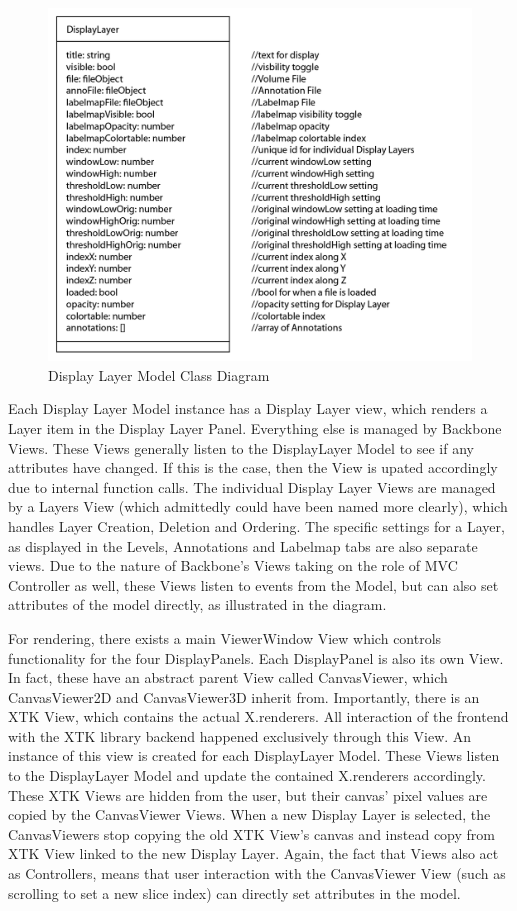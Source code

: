 \documentclass[a4paper,11pt,twoside]{article}
\begin{document}
\begin{figure}[ht!]
\centering
\includegraphics[width=140mm]{graphics/displayLayerUML_01.png}
\caption{Display Layer Model Class Diagram}
\label{fig:layerUML}
\end{figure}

Each Display Layer Model instance has a Display Layer view, which renders a Layer item in the Display Layer Panel. Everything else is managed by Backbone Views. These Views generally listen to the DisplayLayer Model to see if any attributes have changed. If this is the case, then the View is upated accordingly due to internal function calls. The individual Display Layer Views are managed by a Layers View (which admittedly could have been named more clearly), which handles Layer Creation, Deletion and Ordering. The specific settings for a Layer, as displayed in the Levels, Annotations and Labelmap tabs are also separate views. Due to the nature of Backbone's Views taking on the role of MVC Controller as well, these Views listen to events from the Model, but can also set attributes of the model directly, as illustrated in the diagram.

For rendering, there exists a main ViewerWindow View which controls functionality for the four DisplayPanels. Each DisplayPanel is also its own View. In fact, these have an abstract parent View called CanvasViewer, which CanvasViewer2D and CanvasViewer3D inherit from. Importantly, there is an XTK View, which contains the actual X.renderers. All interaction of the frontend with the XTK library backend happened exclusively through this View. An instance of this view is created for each DisplayLayer Model. These Views listen to the DisplayLayer Model and update the contained X.renderers accordingly. These XTK Views are hidden from the user, but their canvas' pixel values are copied by the CanvasViewer Views. When a new Display Layer is selected, the CanvasViewers stop copying the old XTK View's canvas and instead copy from XTK View linked to the new Display Layer. Again, the fact that Views also act as Controllers, means that user interaction with the CanvasViewer View (such as scrolling to set a new slice index) can directly set attributes in the model.
\end{document}
